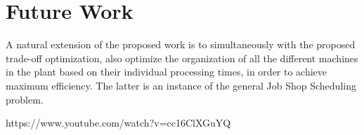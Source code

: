 \documentclass{IEEEtran}
\begin{document}
\section{Future Work}
A natural extension of the proposed work is to simultaneously with the proposed trade-off optimization, also optimize the organization of all the different machines in the plant based on their individual processing times, in order to achieve maximum efficiency. The latter is an instance of the general Job Shop Scheduling problem.

\begin{thebibliography}{00}
 https://www.youtube.com/watch?v=cc16ClXGuYQ
\end{thebibliography}
\end{document}
